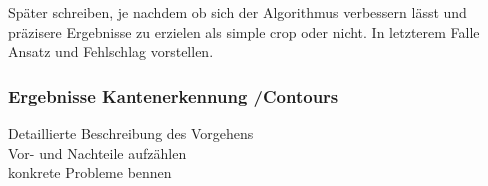 Später schreiben, je nachdem ob sich der Algorithmus verbessern lässt und präzisere Ergebnisse zu erzielen als simple crop oder nicht. In letzterem Falle Ansatz und Fehlschlag vorstellen.\\

\subsubsection{Ergebnisse Kantenerkennung /Contours}
Detaillierte Beschreibung des Vorgehens\\
Vor- und Nachteile aufzählen\\
konkrete Probleme bennen\\

